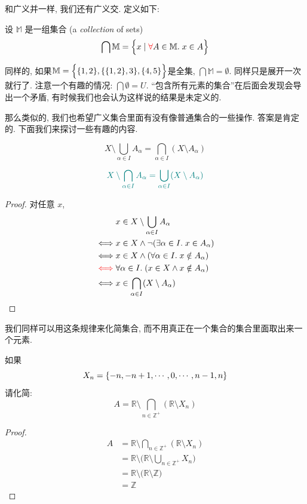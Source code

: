和广义并一样, 我们还有广义交. 定义如下: 
\begin{definition}
  设 $\mathbb{M}$ 是一组集合 (a {\it collection} of sets)
  \[
    \bigcap \mathbb{M} = \Big\{x \mid \textcolor{red}{\forall} A \in \mathbb{M}.\; x \in A\Big\}
  \]
\end{definition}

同样的, 如果$\mathbb{M} = \Big\{\{1, 2\}, \{\{1, 2\}, 3\}, \{4, 5\}\Big\}$是全集,  $\bigcap \mathbb{M} = \emptyset$. 同样只是展开一次就行了. 注意一个有趣的情况: $\bigcap \emptyset =U$. ``包含所有元素的集合''在后面会发现会导出一个矛盾, 有时候我们也会认为这样说的结果是未定义的. 

那么类似的, 我们也希望广义集合里面有没有像普通集合的一些操作. 答案是肯定的. 下面我们来探讨一些有趣的内容. 

\begin{theorem}[德摩根律]
  \[
    X \setminus \bigcup_{\alpha \in I} A_{\alpha} = \bigcap_{\alpha \in I} (X \setminus A_{\alpha})
  \]

  \[
    \textcolor{teal}{X \setminus \bigcap_{\alpha \in I} A_{\alpha} = \bigcup_{\alpha \in I} (X \setminus A_{\alpha})}
  \]
\end{theorem}

\begin{proof}
  对任意 $x$,
  \setcounter{equation}{0}
  \begin{align*}
    &x \in X \setminus \bigcup_{\alpha \in I} A_{\alpha} \\
    \iff & x \in X \land \lnot(\exists \alpha \in I.\; x \in A_{\alpha}) \\
    \iff & x \in X \land (\forall \alpha \in I.\; x \notin A_{\alpha}) \\
    \textcolor{red}{\iff} & \forall \alpha \in I.\; (x \in X \land x \notin A_{\alpha}) \\
    \iff & x \in \bigcap_{\alpha \in I} (X \setminus A_{\alpha})
  \end{align*}
\end{proof}

我们同样可以用这条规律来化简集合, 而不用真正在一个集合的集合里面取出来一个元素. 

\begin{eg}
  如果
  \[
    X_n = \{-n, -n+1, \cdots, 0, \cdots, n-1, n\}
  \]
  请化简: 
  $$A = \mathbb{R} \setminus \bigcap_{n \in \mathbb{Z}^{+}} (\mathbb{R} \setminus X_n) $$
\end{eg}
\begin{proof}
  \begin{align*}
    A &= \mathbb{R} \setminus \bigcap_{n \in \mathbb{Z}^{+}} (\mathbb{R} \setminus X_n) \\
    &= \mathbb{R} \setminus \Big(\mathbb{R} \setminus \bigcup_{n \in \mathbb{Z}^{+}} X_n \Big) \\
    &= \mathbb{R} \setminus \Big(\mathbb{R} \setminus \mathbb{Z} \Big) \\
    &= \mathbb{Z}
  \end{align*}
\end{proof}


